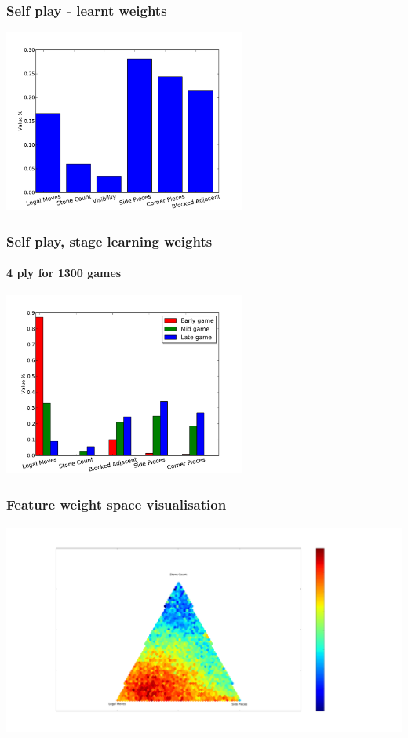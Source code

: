 \documentclass[10pt]{beamer}
\begin{document}
\begin{frame}
  \frametitle{Self play - learnt weights}
  \begin{center} \includegraphics[height=6cm]{Graphs/SelfPlay_Weights.pdf}  \end{center} 
\end{frame}

\begin{frame}
  \frametitle{Self play, stage learning weights}
  \framesubtitle{4 ply for 1300 games}
  \begin{center} \includegraphics[height=6cm]{Graphs/Stages_weights.pdf}  \end{center} 
\end{frame}

\begin{frame}
  \frametitle{Feature weight space visualisation}
  \begin{center} \includegraphics[trim= 12cm 4cm 23cm 7cm, clip, height=7cm]{Graphs/LegalMoves_Count_SidePieces_Triangle.pdf}  \end{center}
\end{frame}
\end{document}
